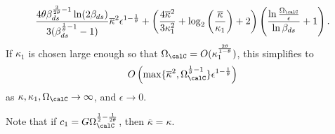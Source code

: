 \begin{theorem}
\begin{enumerate}
\begin{align}
\frac{4\theta
	\beta_{ds}^{\frac{3}{2\theta}-1}\ln(2\beta_{ds})}
{3(\beta_{ds}^{\frac{1}{\theta}-1}-1)
} 
\overline{\kappa}^2
\epsilon^{1-\frac{1}{\theta}}
+
\left(\frac{4\overline{\kappa}^2}{3\kappa_1^2}
+
\log_2\left(\frac{\overline{\kappa}}{\kappa_1}\right)+2
\right)
\left(
\frac{\ln\frac{\Omega_{\calC}}{\epsilon}}{\ln\beta_{ds}}+1  
\right).
\end{align}
If $\kappa_1$ is chosen large enough so that $\Omega_{\calC} = O(\kappa_1^{\frac{2\theta}{1-\theta}})$,
this simplifies to 
\begin{align}\label{bigO3}
O\left(
\max\{\overline{\kappa}^2,\Omega_{\calC}^{\frac{1}{\theta}-1}\}\epsilon^{1-\frac{1}{\theta}}
\right)
\end{align}
as $\kappa,\kappa_1,\Omega_{\calC}\to\infty$, and $\epsilon\to 0$. 

\end{enumerate}
Note that if $c_1=G\Omega_{\calC}^{\frac{1}{2}-\frac{1}{2\theta}}$, then $\overline{\kappa}=\kappa$. 

\end{theorem}
